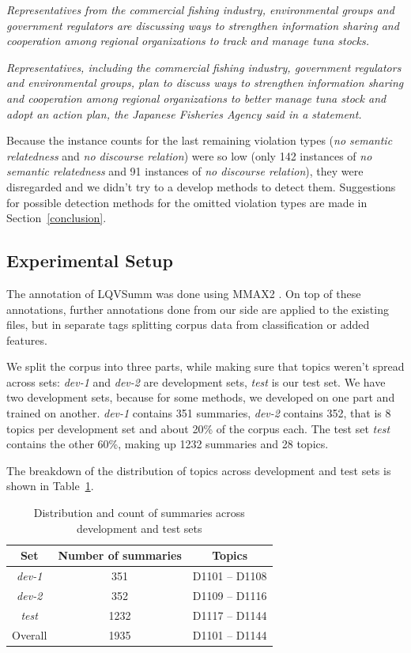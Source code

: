\documentclass[a4paper,10pt]{scrartcl}
\theoremstyle{style}
\begin{document}
\quad\textit{Representatives from the commercial fishing industry, environmental groups and government regulators are discussing ways to strengthen information sharing and cooperation among regional organizations to track and manage tuna stocks.}

\quad\textit{Representatives, including the commercial fishing industry, government regulators and environmental groups, plan to discuss ways to strengthen information sharing and cooperation among regional organizations to better manage tuna stock and adopt an action plan, the Japanese Fisheries Agency said in a statement.}

Because the instance counts for the last remaining violation types (\textit{no semantic relatedness} and \textit{no discourse relation}) were so low (only 142 instances of \textit{no semantic relatedness} and 91 instances of \textit{no discourse relation}), they were disregarded and we didn't try to a develop methods to detect them.
Suggestions for possible detection methods for the omitted violation types are made in Section~\ref{conclusion}.

\subsection{Experimental Setup}
The annotation of LQVSumm was done using MMAX2 \citep{muller2006multi}. On top of these annotations, further annotations done from our side are applied to the existing files, but in separate tags splitting corpus data from classification or added features.

We split the corpus into three parts, while making sure that topics weren't spread across sets: \textit{dev-1} and \textit{dev-2} are development sets, \textit{test} is our test set. We have two development sets, because for some methods, we developed on one part and trained on another.
\textit{dev-1} contains 351 summaries, \textit{dev-2} contains 352, that is 8 topics per development set and about 20\% of the corpus each.
The test set \textit{test} contains the other 60\%, making up 1232 summaries and 28 topics.

The breakdown of the distribution of topics across development and test sets is shown in Table~\ref{testsets}.

\begin{table}[H]
\begin{center}
\begin{tabular}{|c|c|c|}
\hline
\textbf{Set} & \textbf{Number of summaries} & \textbf{Topics}\\
\hline
\textit{dev-1} & 351 & D1101 -- D1108\\
\hline
\textit{dev-2} & 352 & D1109 -- D1116\\
\hline
\textit{test} & 1232 & D1117 -- D1144\\
\hline\hline
Overall & 1935 & D1101 -- D1144\\
\hline
\end{tabular}
\end{center}
\label{testsets}
\caption{Distribution and count of summaries across development and test sets}
\end{table}
\end{document}
